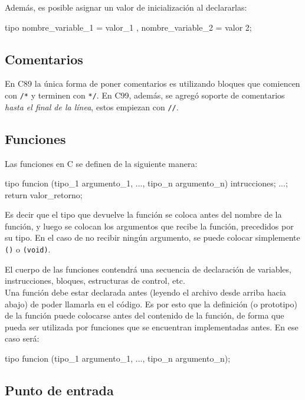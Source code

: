 Además, es posible asignar un valor de inicialización al declararlas:

\begin{codigo-c-plano}
tipo nombre_variable_1 = valor_1 , nombre_variable_2 = valor 2;
\end{codigo-c-plano}

\subsection{Comentarios}

En C89 la única forma de poner comentarios es utilizando bloques que comiencen
con \lstinline!/*! y terminen con \lstinline!*/!. En C99, además, se agregó
soporte de comentarios \textit{hasta el final de la línea}, estos empiezan con
\lstinline!//!.

\subsection{Funciones}

Las funciones en C se definen de la siguiente manera:

\begin{codigo-c-plano}
tipo funcion (tipo_1 argumento_1, ..., tipo_n argumento_n)
{
    intrucciones;
    ...;
    return valor_retorno;
}
\end{codigo-c-plano}

Es decir que el tipo que devuelve la función se coloca antes del nombre de la
función, y luego se colocan los argumentos que recibe la función, precedidos
por su tipo.  En el caso de no recibir ningún argumento, se puede colocar
simplemente \lstinline!()! o \lstinline!(void)!.

El cuerpo de las funciones contendrá una secuencia de declaración de
variables, instrucciones, bloques, estructuras de control, etc.  \\

Una función debe estar declarada antes (leyendo el archivo desde arriba hacia
abajo) de poder llamarla en el código.  Es por esto que la definición (o
prototipo) de la función puede colocarse antes del contenido de la función, de
forma que pueda ser utilizada por funciones que se encuentran implementadas
antes.  En ese caso será:

\begin{codigo-c-plano}
tipo funcion (tipo_1 argumento_1, ..., tipo_n argumento_n);
\end{codigo-c-plano}

\subsection{Punto de entrada}


